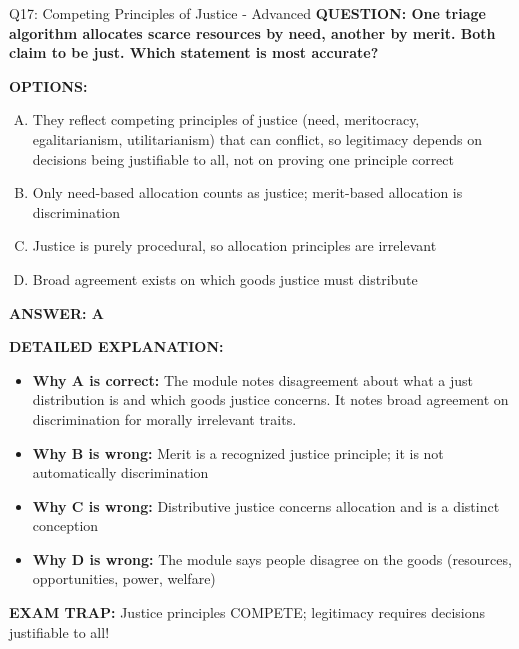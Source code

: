 \documentclass[8pt]{beamer}
\begin{document}
\begin{frame}[shrink=6]{Q17: Competing Principles of Justice - Advanced}
\fontsize{6.5}{7.5}\selectfont
\textbf{QUESTION: One triage algorithm allocates scarce resources by need, another by merit. Both claim to be just. Which statement is most accurate?}

\vspace{0.1cm}
\textbf{OPTIONS:}
\begin{enumerate}[A.]
\item They reflect competing principles of justice (need, meritocracy, egalitarianism, utilitarianism) that can conflict, so legitimacy depends on decisions being justifiable to all, not on proving one principle correct
\item Only need-based allocation counts as justice; merit-based allocation is discrimination
\item Justice is purely procedural, so allocation principles are irrelevant
\item Broad agreement exists on which goods justice must distribute
\end{enumerate}

\vspace{0.1cm}
\textcolor{myblue}{\textbf{ANSWER: A}}

\vspace{0.1cm}
\textbf{DETAILED EXPLANATION:}
\begin{itemize}
\item \textbf{Why A is correct:} The module notes disagreement about what a just distribution is and which goods justice concerns. It notes broad agreement on discrimination for morally irrelevant traits.
\item \textbf{Why B is wrong:} Merit is a recognized justice principle; it is not automatically discrimination
\item \textbf{Why C is wrong:} Distributive justice concerns allocation and is a distinct conception
\item \textbf{Why D is wrong:} The module says people disagree on the goods (resources, opportunities, power, welfare)
\end{itemize}

\textcolor{myred}{\textbf{EXAM TRAP:}} Justice principles COMPETE; legitimacy requires decisions justifiable to all!
\end{frame}
\end{document}
